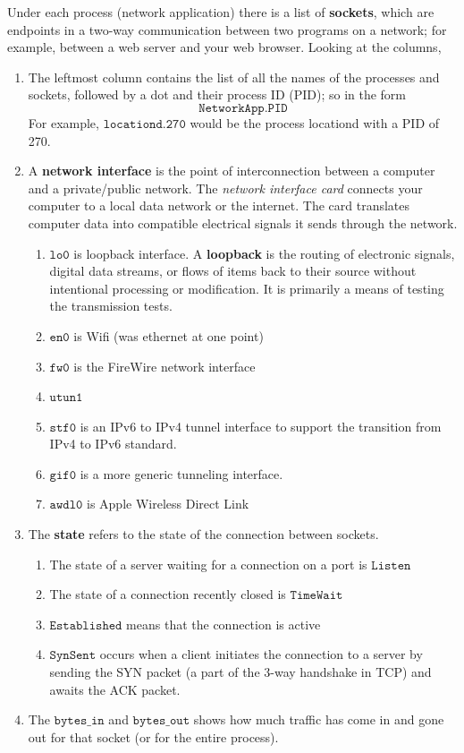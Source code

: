 \documentclass{article}
\newcounter{example}[section]
\begin{document}
  Under each process (network application) there is a list of \textbf{sockets}, which are endpoints in a two-way communication between two programs on a network; for example, between a web server and your web browser. Looking at the columns, 
  \begin{enumerate}
      \item The leftmost column contains the list of all the names of the processes and sockets, followed by a dot and their process ID (PID); so in the form
      \begin{equation}
        \texttt{NetworkApp.PID}
      \end{equation}
      For example, $\texttt{locationd.270}$ would be the process locationd with a PID of 270. 
      \item A \textbf{network interface} is the point of interconnection between a computer and a private/public network. The \textit{network interface card} connects your computer to a local data network or the internet. The card translates computer data into compatible electrical signals it sends through the network. 
      \begin{enumerate}
          \item $\texttt{lo0}$ is loopback interface. A \textbf{loopback} is the routing of electronic signals, digital data streams, or flows of items back to their source without intentional processing or modification. It is primarily a means of testing the transmission tests. 
          \item $\texttt{en0}$ is Wifi (was ethernet at one point)
          \item $\texttt{fw0}$ is the FireWire network interface 
          \item $\texttt{utun1}$
          \item $\texttt{stf0}$ is an IPv6 to IPv4 tunnel interface to support the transition from IPv4 to IPv6 standard. 
          \item $\texttt{gif0}$ is a more generic tunneling interface. 
          \item $\texttt{awdl0}$ is Apple Wireless Direct Link
      \end{enumerate}
      \item The \textbf{state} refers to the state of the connection between sockets. 
      \begin{enumerate}
          \item The state of a server waiting for a connection on a port is $\texttt{Listen}$
          \item The state of a connection recently closed is $\texttt{TimeWait}$ 
          \item $\texttt{Established}$ means that the connection is active
          \item $\texttt{SynSent}$ occurs when a client initiates the connection to a server by sending the SYN packet (a part of the 3-way handshake in TCP) and awaits the ACK packet. 
      \end{enumerate}
      \item The $\texttt{bytes\_in}$ and $\texttt{bytes\_out}$ shows how much traffic has come in and gone out for that socket (or for the entire process).
  \end{enumerate}
\end{document}
